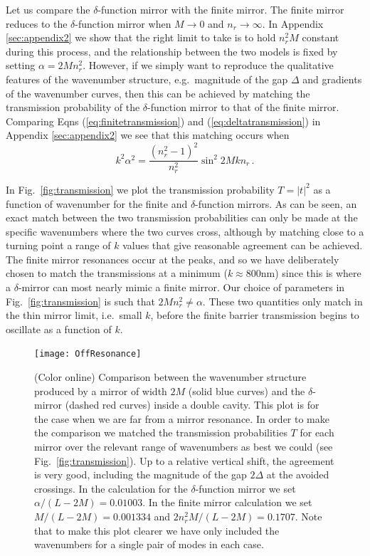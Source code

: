 \documentclass[twocolumn,english,pra,aps,superscriptaddress,floatfix]{revtex4-1}
\begin{document}
Let us compare the $\delta$-function mirror with the finite mirror. The finite mirror reduces to the $\delta$-function mirror when $M \rightarrow 0$ and $n_{r} \rightarrow \infty$. In Appendix \ref{sec:appendix2} we show that the right limit to take is to hold $n_{r}^2M$ constant during this process, and the relationship between the two models is fixed by setting $\alpha= 2 M n_{r}^2$. However, if we simply want to reproduce the qualitative features of the wavenumber structure, e.g.\ magnitude of the gap $\Delta$ and gradients of the wavenumber curves, then this can be achieved by matching the transmission probability of the $\delta$-function mirror to that of the finite mirror. Comparing Eqns (\ref{eq:finitetransmission}) and (\ref{eq:deltatransmission}) in Appendix \ref{sec:appendix2} we see that this matching occurs when
\begin{equation}
k^2 \alpha^2 = \frac{(n_{r}^2-1)^2}{n_{r}^2} \sin^{2} 2Mkn_{r} \, .
\end{equation}

In Fig.\ \ref{fig:transmission} we plot the transmission probability $T=\vert t \vert^2$ as a function of wavenumber for the finite and $\delta$-function mirrors. As can be seen, an exact match between the two transmission probabilities can only be made at the specific wavenumbers where the two curves cross, although by matching close to a turning point a range of $k$ values that give reasonable agreement can be achieved. The finite mirror resonances occur at the peaks, and so we have deliberately chosen to match the transmissions at a minimum ($k \approx 800$nm) since this is where a $\delta$-mirror can most nearly mimic a finite mirror.
 Our choice of parameters in Fig.\ \ref{fig:transmission} is such that $2M n_{r}^2 \neq \alpha$. These two quantities only match in the thin mirror limit, i.e.\ small $k$, before the finite barrier transmission begins to oscillate as a function of $k$.

\begin{figure}
\texttt{[image: OffResonance]}
\caption{(Color online) Comparison between the wavenumber structure produced by a mirror of width $2M$ (solid blue curves) and
the $\delta$-mirror (dashed red curves) inside a double cavity. This plot is for the case when we are far from a mirror resonance. In order to make the comparison we matched the transmission probabilities $T$ for each mirror over the relevant range of wavenumbers as best we could (see Fig.\ \ref{fig:transmission}). Up to a relative vertical shift, the agreement is very good, including  the magnitude of the gap $2 \Delta$ at the avoided crossings. In the calculation for the $\delta$-function mirror we set  $\alpha/(L-2M) =0.01003$. In the finite mirror calculation we set $M/(L-2M)=0.001334 $ and $2 n_{r}^2 M/(L-2M)= 0.1707$.  Note that to make this plot clearer we have only included the wavenumbers for a single pair of modes in each case.}
\label{fig:DFB}
\end{figure}
\end{document}

